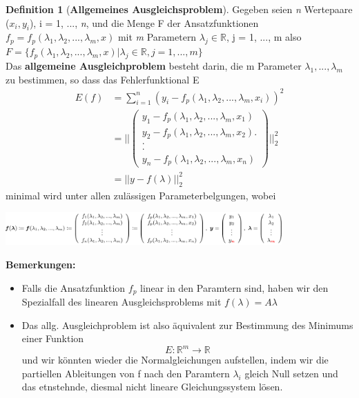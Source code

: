\documentclass{article}
\newenvironment{Figure}
	{\par\medskip\noindent\minipage{\linewidth}}
	{\endminipage\par\medskip}
\theoremstyle{satz}
\theoremstyle{definition}
\newtheorem{definition}{Definition}
\begin{document}
\theoremstyle{definition}
\begin{tcolorbox}
\begin{definition}[\textbf{Allgemeines Ausgleichsproblem}]
Gegeben seien \textit{n} Wertepaare ($x_i,y_i$), i = 1, ..., \textit{n}, und die Menge F der Ansatzfunktionen $f_p = f_p (\lambda_1, \lambda_2, ..., \lambda_m, x)$ mit \textit{m} Parametern $\lambda_j \in \mathbb{R}$, j = 1, ..., m also $F=\{f_p(\lambda_1, \lambda_2, ..., \lambda_m, x) | \lambda_j \in \mathbb{R}, j = 1, ..., m\}$\\
Das \textbf{allgemeine Ausgleichproblem} besteht darin, die m Parameter $\lambda_1, ..., \lambda_m$ zu bestimmen, so dass das Fehlerfunktional E
\begin{equation}
\begin{split}
E(f) &= \sum\limits_{i=1}^n (y_i - f_p (\lambda_1, \lambda_2, ..., \lambda_m, x_i))^2\\
&= || \begin{pmatrix}
y_1 - f_p(\lambda_1, \lambda_2, ..., \lambda_m, x_1)\\
y_2 - f_p(\lambda_1, \lambda_2, ..., \lambda_m, x_2)
.\\
.\\
.\\
y_n - f_p(\lambda_1, \lambda_2, ..., \lambda_m, x_n)
\end{pmatrix} ||^2_2\\
&= || y - f(\lambda)||^2_2
\end{split}
\end{equation}
minimal wird unter allen zulässigen Parameterbelgungen, wobei
\begin{Figure}
\centering
\includegraphics[width=400px]{img/AllgAusgleichsproblemBedingungen.png}
	\label{fig:Bedingungen bei allgemeinen Ausgleichsproblem}
\end{Figure}
\textbf{Bemerkungen: }\\
\begin{itemize}
	\item Falls die Ansatzfunktion $f_p$ linear in den Paramtern sind, haben wir den Spezialfall des linearen Ausgleichsproblems mit $f(\lambda) = A\lambda$
	\item {Das allg. Ausgleichproblem ist also äquivalent zur Bestimmung des Minimums einer Funktion 
	\begin{equation}
	E: \mathbb{R}^m \rightarrow \mathbb{R}
	\end{equation}
	und wir könnten wieder die Normalgleichungen aufstellen, indem wir die partiellen Ableitungen von f nach den Paramtern $\lambda_i$ gleich Null setzen und das etnstehnde, diesmal nicht lineare Gleichungssystem lösen.
	}
\end{itemize}
\end{definition}
\end{tcolorbox}
\end{document}
